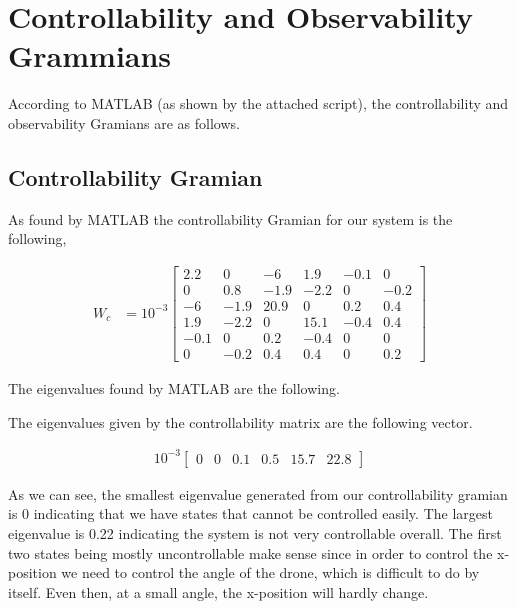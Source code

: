 \documentclass{article}
\begin{document}
    \section{Controllability and Observability Grammians}\label{sec:controllability_and_observability}

    According to MATLAB (as shown by the attached script), the controllability and observability Gramians are as follows.

    \subsection{Controllability Gramian}\label{subsec:Controllability Gramian}

    As found by MATLAB the controllability Gramian for our system is the following,

    \begin{align}
        W_c &= 10^{-3}\begin{bmatrix} 2.2 & 0 & -6 & 1.9 & -0.1 & 0 \\ 0 & 0.8 & -1.9 & -2.2 & 0 & -0.2 \\ -6 & -1.9 & 20.9 & 0 & 0.2 & 0.4 \\ 1.9 & -2.2 & 0 & 15.1 & -0.4 & 0.4 \\ -0.1 & 0 & 0.2 & -0.4 & 0 & 0 \\ 0 & -0.2 & 0.4 & 0.4 & 0 & 0.2 \end{bmatrix}
    \end{align}

    The eigenvalues found by MATLAB are the following.

    The eigenvalues given by the controllability matrix are the following vector.

    \begin{align}
        10^{-3} \begin{bmatrix} 0 & 0 & 0.1 & 0.5 & 15.7 & 22.8 \end{bmatrix}
    \end{align}

    As we can see, the smallest eigenvalue generated from our controllability gramian is 0 indicating that we have states that cannot be controlled easily.
    The largest eigenvalue is 0.22 indicating the system is not very controllable overall.
    The first two states being mostly uncontrollable make sense since in order to control the x-position
    we need to control the angle of the drone, which is difficult to do by itself.
    Even then, at a small angle, the x-position will hardly change.
\end{document}
